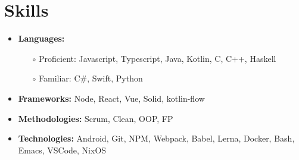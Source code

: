\documentclass[11pt, a4paper]{article}
\begin{document}
\vspace{-0.2in}

\section*{Skills}
\begin{itemize}
  \item {\bf Languages:}
        \vspace{-0.1in}
        \begin{itemize}
          \item[$\circ$] Proficient: Javascript, Typescript, Java, Kotlin, C, C++, Haskell
            \vspace{-0.05in}
          \item[$\circ$] Familiar: C\#, Swift, Python
        \end{itemize}
        \vspace{-0.15in}
  \item {\bf Frameworks:} Node, React, Vue, Solid, kotlin-flow
        \vspace{-0.1in}
  \item {\bf Methodologies:} Scrum, Clean, OOP, FP
        \vspace{-0.1in}
  \item {\bf Technologies:} Android, Git, NPM, Webpack, Babel, Lerna, Docker, Bash, Emacs, VSCode, NixOS
\end{itemize}
\end{document}
